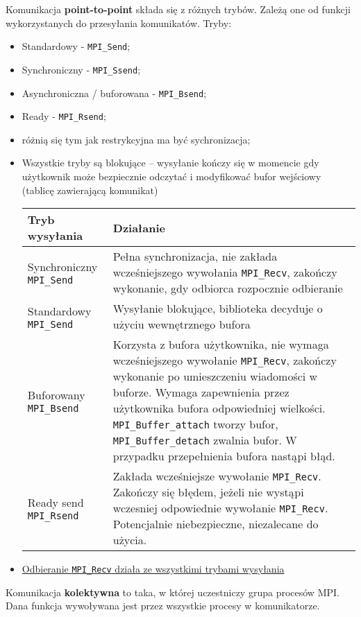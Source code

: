 Komunikacja \textbf{point-to-point} składa się z różnych trybów. Zależą one od funkcji wykorzystanych do przesyłania komunikatów. Tryby:
\begin{itemize}
\item Standardowy - \texttt{MPI\_Send};
\item Synchroniczny - \texttt{MPI\_Ssend};
\item Asynchroniczna / buforowana - \texttt{MPI\_Bsend};
\item Ready - \texttt{MPI\_Rsend};
\item różnią się tym jak restrykcyjna ma być sychronizacja;
\item Wszystkie tryby są blokujące -- wysyłanie kończy się w momencie gdy użytkownik może bezpiecznie odczytać i modyfikować bufor wejściowy (tablicę zawierającą komunikat)
\begin{table}[H]
\begin{tabularx}{\textwidth}{|l|X|}\hline
\textbf{Tryb wysyłania} & \textbf{Działanie} \\ \hline
Synchroniczny \texttt{MPI\_Send} & Pełna synchronizacja, nie zakłada wcześniejszego wywołania \texttt{MPI\_Recv}, zakończy wykonanie, gdy odbiorca rozpocznie odbieranie \\ \hline
Standardowy \texttt{MPI\_Send} & Wysyłanie blokujące, biblioteka decyduje o użyciu wewnętrznego bufora \\ \hline
Buforowany \texttt{MPI\_Bsend} & Korzysta z bufora użytkownika, nie wymaga wcześniejszego wywołanie \texttt{MPI\_Recv}, zakończy wykonanie po umieszczeniu wiadomości w buforze. Wymaga zapewnienia przez użytkownika bufora odpowiedniej wielkości. \texttt{MPI\_Buffer\_attach} tworzy bufor, \texttt{MPI\_Buffer\_detach} zwalnia bufor. W przypadku przepełnienia bufora nastąpi błąd. \\ \hline
Ready send \texttt{MPI\_Rsend} & Zakłada wcześniejsze wywołanie \texttt{MPI\_Recv}. Zakończy się błędem, jeżeli nie wystąpi wczesniej odpowiednie wywołanie \texttt{MPI\_Recv}. Potencjalnie niebezpieczne, niezalecane do użycia. \\ \hline
\end{tabularx}
\end{table}
\item \underline{Odbieranie \texttt{MPI\_Recv} działa ze wszystkimi trybami wysyłania}
\end{itemize}

Komunikacja \textbf{kolektywna} to taka, w której uczestniczy grupa procesów MPI. Dana funkcja wywoływana jest przez wszystkie procesy w komunikatorze. 

